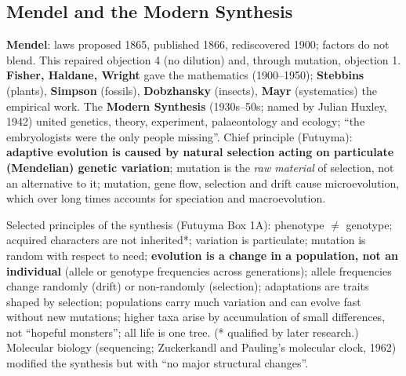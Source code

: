 \subsection{Mendel and the Modern Synthesis}
\textbf{Mendel}: laws proposed 1865, published 1866, rediscovered 1900; factors do not blend. This repaired objection 4
(no dilution) and, through mutation, objection 1. \textbf{Fisher, Haldane, Wright} gave the mathematics (1900--1950);
\textbf{Stebbins} (plants), \textbf{Simpson} (fossils), \textbf{Dobzhansky} (insects), \textbf{Mayr} (systematics) the
empirical work. The \textbf{Modern Synthesis} (1930s--50s; named by Julian Huxley, 1942) united genetics,
theory, experiment, palaeontology and ecology; ``the embryologists were the only people missing''.
Chief principle (Futuyma): \textbf{adaptive evolution is caused by natural selection acting on particulate (Mendelian)
genetic variation}; mutation is the \emph{raw material} of selection, not an alternative to it; mutation, gene flow,
selection and drift cause microevolution, which over long times accounts for speciation and macroevolution.

Selected principles of the synthesis (Futuyma Box 1A): phenotype $\neq$ genotype; acquired characters are not inherited*;
variation is particulate; mutation is random with respect to need; \textbf{evolution is a change in a population, not an
individual} (allele or genotype frequencies across generations); allele frequencies change randomly (drift) or
non-randomly (selection); adaptations are traits shaped by selection; populations carry much variation and can evolve fast
without new mutations; higher taxa arise by accumulation of small differences, not ``hopeful monsters''; all life is one
tree. (* qualified by later research.) Molecular biology (sequencing; Zuckerkandl and Pauling's molecular clock, 1962)
modified the synthesis but with ``no major structural changes''.

